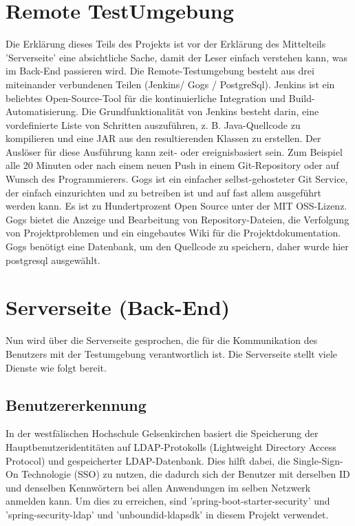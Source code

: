 \documentclass[a4paper,12pt,oneside]{book}
\begin{document}
\section{Remote TestUmgebung}
Die Erklärung dieses Teils des Projekts ist vor der Erklärung des Mittelteils 'Serverseite' eine absichtliche Sache, damit der Leser einfach verstehen kann, was im Back-End passieren wird.
\newline
Die Remote-Testumgebung besteht aus drei miteinander verbundenen Teilen (Jenkins/ Gogs / PostgreSql).
\newline
Jenkins ist ein beliebtes Open-Source-Tool für die kontinuierliche Integration und Build-Automatisierung. Die Grundfunktionalität von Jenkins besteht darin, eine vordefinierte Liste von Schritten auszuführen, z. B. Java-Quellcode zu kompilieren und eine JAR aus den resultierenden Klassen zu erstellen. Der Auslöser für diese Ausführung kann zeit- oder ereignisbasiert sein. Zum Beispiel alle 20 Minuten oder nach einem neuen Push in einem Git-Repository oder auf Wunsch des Programmierers. 
\newline
Gogs ist ein einfacher selbst-gehosteter Git Service, der einfach einzurichten und zu betreiben ist und auf fast allem ausgeführt werden kann. Es ist zu Hundertprozent Open Source unter der MIT OSS-Lizenz. Gogs bietet die Anzeige und Bearbeitung von Repository-Dateien, die Verfolgung von Projektproblemen und ein eingebautes Wiki für die Projektdokumentation.
Gogs benötigt eine Datenbank, um den Quellcode zu speichern, daher wurde hier postgresql ausgewählt.

\section{Serverseite (Back-End)}
Nun wird über die Serverseite gesprochen, die für die Kommunikation des Benutzers mit der Testumgebung verantwortlich ist.
\newline
Die Serverseite stellt viele Dienste wie folgt bereit.
\subsection{Benutzererkennung}

In der westfälischen Hochschule Gelsenkirchen basiert die Speicherung der Hauptbenutzeridentitäten auf LDAP-Protokolls (Lightweight Directory Access Protocol) und gespeicherter LDAP-Datenbank. Dies hilft dabei, die Single-Sign-On Technologie (SSO) zu nutzen, die dadurch sich der Benutzer mit derselben ID und denselben Kennwörtern bei allen Anwendungen im selben Netzwerk anmelden kann. Um dies zu erreichen, sind 'spring-boot-starter-security' und 'spring-security-ldap' und 'unboundid-ldapsdk' in diesem Projekt verwendet.
\end{document}
